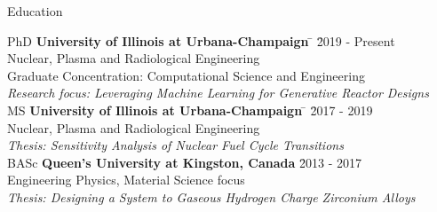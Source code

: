 \documentclass{resume2} %
\begin{document}
\centering
\iffalse
I am an engineer that is passionate about \\ 
nuclear technology and developing innovative \\
systems to face today's energy challenges.   

Gwen is passionate about nuclear power and developing \\
innovative systems to improve nuclear energy and fuel cycle\\
technologies. She wants to contribute to pressing global\\
energy challenges and environmental sustainability. 
\fi

\raggedright

\begin{rSection}{Education}
	
\begin{tabbing}
PhD \hspace*{1.5 em}\= \textbf{University of Illinois at Urbana-Champaign} \hspace*{5em} \= \hspace*{7.7em} \= 2019 - Present \\
\> Nuclear, Plasma and Radiological Engineering \\
\> Graduate Concentration: Computational Science and Engineering \\
\> \textit{Research focus: Leveraging Machine Learning for Generative Reactor Designs} \\
%	
MS \hspace*{2 em}\= \textbf{University of Illinois at Urbana-Champaign} \hspace*{5em} \= \hspace*{9em} \= 2017 - 2019 \\
\> Nuclear, Plasma and Radiological Engineering \\
\> \textit{Thesis: Sensitivity Analysis of Nuclear Fuel Cycle Transitions}\\
%
BASc \hspace*{2 em}\> \textbf{Queen's University at Kingston, Canada} \> \hspace*{9em} \= 2013 - 2017 \\
\> Engineering Physics, Material Science focus \\
\> \textit{Thesis: Designing a System to Gaseous Hydrogen Charge Zirconium Alloys }
\end{tabbing}

\end{rSection}
\end{document}
